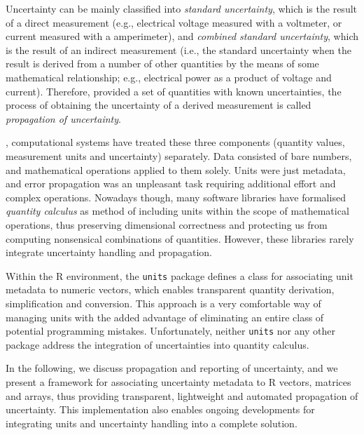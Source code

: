 \documentclass[twoside,nohyper]{tufte-book}
\theoremstyle{definition}
\theoremstyle{definition}
\theoremstyle{definition}
\theoremstyle{remark}
\begin{document}
\fussy

Uncertainty can be mainly classified into \emph{standard uncertainty},
which is the result of a direct measurement (e.g., electrical voltage
measured with a voltmeter, or current measured with a amperimeter), and
\emph{combined standard uncertainty}, which is the result of an indirect
measurement (i.e., the standard uncertainty when the result is derived
from a number of other quantities by the means of some mathematical
relationship; e.g., electrical power as a product of voltage and
current). Therefore, provided a set of quantities with known
uncertainties, the process of obtaining the uncertainty of a derived
measurement is called \emph{propagation of uncertainty}.

, computational systems have treated these
three components (quantity values, measurement units and uncertainty)
separately. Data consisted of bare numbers, and mathematical operations
applied to them solely. Units were just metadata, and error propagation
was an unpleasant task requiring additional effort and complex
operations. Nowadays though, many software libraries have formalised
\emph{quantity calculus} as method of including units within the scope
of mathematical operations, thus preserving dimensional correctness and
protecting us from computing nonsensical combinations of quantities.
However, these libraries rarely integrate uncertainty handling and
propagation\cite[-15mm]{Flatter:2018}.

Within the R environment, the \texttt{units}
package\cite[0pt]{CRAN:units,Pebesma:2016:units}
defines a class for associating unit metadata to numeric vectors, which
enables transparent quantity derivation, simplification and conversion.
This approach is a very comfortable way of managing units with the added
advantage of eliminating an entire class of potential programming
mistakes. Unfortunately, neither \texttt{units} nor any other package
address the integration of uncertainties into quantity calculus.

In the following, we discuss propagation and reporting of uncertainty,
and we present a framework for associating uncertainty metadata to R
vectors, matrices and arrays, thus providing transparent, lightweight
and automated propagation of uncertainty. This implementation also
enables ongoing developments for integrating units and uncertainty
handling into a complete solution.
\end{document}

